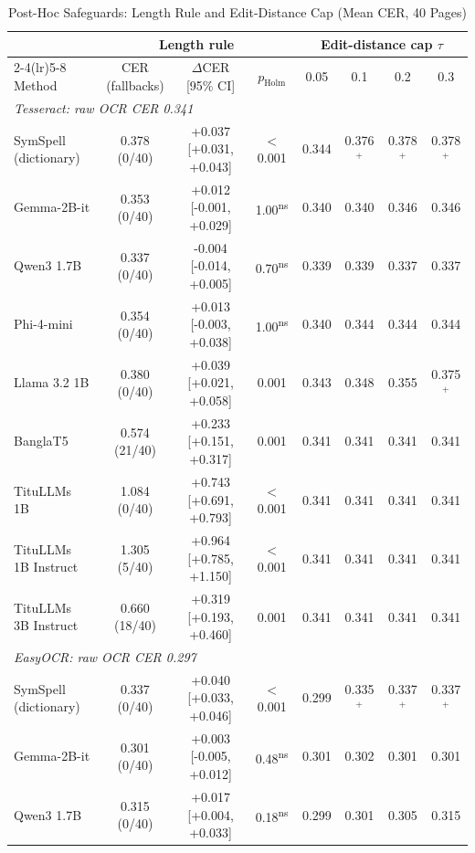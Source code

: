 \begin{table}[t]
\centering
\caption{Post-Hoc Safeguards: Length Rule and Edit-Distance Cap (Mean CER, 40 Pages)}
\label{tab:safeguards}
\setlength{\tabcolsep}{4pt}
\footnotesize
\begin{tabular}{lccccccc}
\toprule
 & \multicolumn{3}{c}{Length rule} & \multicolumn{4}{c}{Edit-distance cap $\tau$} \\
\cmidrule(lr){2-4}\cmidrule(lr){5-8}
Method & CER (fallbacks) & $\Delta$CER [95\% CI] & $p_{\mathrm{Holm}}$ & 0.05 & 0.1 & 0.2 & 0.3 \\
\midrule
\multicolumn{8}{l}{\textit{Tesseract: raw OCR CER 0.341}} \\
SymSpell (dictionary) & 0.378 (0/40) & +0.037 [+0.031, +0.043] & $<$0.001 & 0.344 & 0.376$^{+}$ & 0.378$^{+}$ & 0.378$^{+}$ \\
Gemma-2B-it & 0.353 (0/40) & +0.012 [-0.001, +0.029] & 1.00\textsuperscript{ns} & 0.340 & 0.340 & 0.346 & 0.346 \\
Qwen3 1.7B & 0.337 (0/40) & -0.004 [-0.014, +0.005] & 0.70\textsuperscript{ns} & 0.339 & 0.339 & 0.337 & 0.337 \\
Phi-4-mini & 0.354 (0/40) & +0.013 [-0.003, +0.038] & 1.00\textsuperscript{ns} & 0.340 & 0.344 & 0.344 & 0.344 \\
Llama 3.2 1B & 0.380 (0/40) & +0.039 [+0.021, +0.058] & 0.001 & 0.343 & 0.348 & 0.355 & 0.375$^{+}$ \\
BanglaT5 & 0.574 (21/40) & +0.233 [+0.151, +0.317] & 0.001 & 0.341 & 0.341 & 0.341 & 0.341 \\
TituLLMs 1B & 1.084 (0/40) & +0.743 [+0.691, +0.793] & $<$0.001 & 0.341 & 0.341 & 0.341 & 0.341 \\
TituLLMs 1B Instruct & 1.305 (5/40) & +0.964 [+0.785, +1.150] & $<$0.001 & 0.341 & 0.341 & 0.341 & 0.341 \\
TituLLMs 3B Instruct & 0.660 (18/40) & +0.319 [+0.193, +0.460] & 0.001 & 0.341 & 0.341 & 0.341 & 0.341 \\
\midrule
\multicolumn{8}{l}{\textit{EasyOCR: raw OCR CER 0.297}} \\
SymSpell (dictionary) & 0.337 (0/40) & +0.040 [+0.033, +0.046] & $<$0.001 & 0.299 & 0.335$^{+}$ & 0.337$^{+}$ & 0.337$^{+}$ \\
Gemma-2B-it & 0.301 (0/40) & +0.003 [-0.005, +0.012] & 0.48\textsuperscript{ns} & 0.301 & 0.302 & 0.301 & 0.301 \\
Qwen3 1.7B & 0.315 (0/40) & +0.017 [+0.004, +0.033] & 0.18\textsuperscript{ns} & 0.299 & 0.301 & 0.305 & 0.315 \\

\end{tabular}
\end{table}

